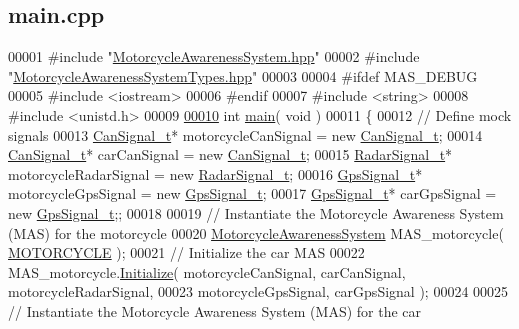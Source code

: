 \hypertarget{main_8cpp_source}{\subsection{main.\-cpp}
}

\begin{DoxyCode}
00001 \textcolor{preprocessor}{#include "\hyperlink{MotorcycleAwarenessSystem_8hpp}{MotorcycleAwarenessSystem.hpp}"}
00002 \textcolor{preprocessor}{#include "\hyperlink{MotorcycleAwarenessSystemTypes_8hpp}{MotorcycleAwarenessSystemTypes.hpp}"}
00003 
00004 \textcolor{preprocessor}{#ifdef MAS\_DEBUG}
00005 \textcolor{preprocessor}{}\textcolor{preprocessor}{#include <iostream>}
00006 \textcolor{preprocessor}{#endif}
00007 \textcolor{preprocessor}{}\textcolor{preprocessor}{#include <string>}
00008 \textcolor{preprocessor}{#include <unistd.h>}
00009 
\hypertarget{main_8cpp_source_l00010}{}\hyperlink{main_8cpp_a840291bc02cba5474a4cb46a9b9566fe}{00010} \textcolor{keywordtype}{int} \hyperlink{main_8cpp_a840291bc02cba5474a4cb46a9b9566fe}{main}( \textcolor{keywordtype}{void} )
00011 \{
00012     \textcolor{comment}{// Define mock signals}
00013     \hyperlink{structCanSignal__t}{CanSignal\_t}* motorcycleCanSignal = \textcolor{keyword}{new} \hyperlink{structCanSignal__t}{CanSignal\_t};
00014     \hyperlink{structCanSignal__t}{CanSignal\_t}* carCanSignal = \textcolor{keyword}{new} \hyperlink{structCanSignal__t}{CanSignal\_t};
00015     \hyperlink{structRadarSignal__t}{RadarSignal\_t}* motorcycleRadarSignal = \textcolor{keyword}{new} \hyperlink{structRadarSignal__t}{RadarSignal\_t};
00016     \hyperlink{structGpsSignal__t}{GpsSignal\_t}* motorcycleGpsSignal = \textcolor{keyword}{new} \hyperlink{structGpsSignal__t}{GpsSignal\_t};
00017     \hyperlink{structGpsSignal__t}{GpsSignal\_t}* carGpsSignal = \textcolor{keyword}{new} \hyperlink{structGpsSignal__t}{GpsSignal\_t};;
00018 
00019     \textcolor{comment}{// Instantiate the Motorcycle Awareness System (MAS) for the motorcycle}
00020     \hyperlink{classMotorcycleAwarenessSystem}{MotorcycleAwarenessSystem} MAS\_motorcycle( 
      \hyperlink{MotorcycleAwarenessSystemTypes_8hpp_a0c05c42b98a847f971385c81c2a81afaa39b983b1f7acfc4e7c900d77b0fded6a}{MOTORCYCLE} );
00021     \textcolor{comment}{// Initialize the car MAS}
00022     MAS\_motorcycle.\hyperlink{classMotorcycleAwarenessSystem_a55f1ea16b6311120ea42b460fb8b3a71}{Initialize}( motorcycleCanSignal, carCanSignal, motorcycleRadarSignal,
00023                                           motorcycleGpsSignal, carGpsSignal );
00024 
00025     \textcolor{comment}{// Instantiate the Motorcycle Awareness System (MAS) for the car}

\end{DoxyCode}

